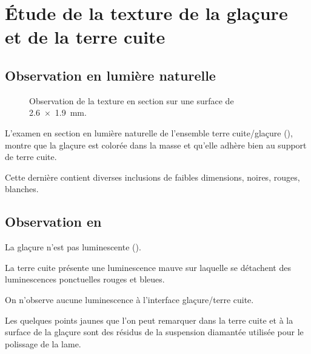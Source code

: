 \section{Étude de la texture de la glaçure et de la terre cuite}

\subsection{Observation en lumière naturelle}
\begin{figure}[htb]
  \begin{minipage}[t]{0.4\textwidth}
  \end{minipage}
  \begin{minipage}[t]{0.4\textwidth}
    \subcaption{\CL \label{texture:6530_CL}}
  \end{minipage}
  \caption[\ -- Observation de la texture en section]
          {\legendeC 
           Observation de la texture en section sur une surface de 
           \SI{2.6x1.9}{\mm}.}
  \label{texture:6530}
\end{figure}

L'examen en section en lumière naturelle de l'ensemble terre 
cuite/glaçure (), montre que la glaçure est 
colorée dans la masse et qu'elle adhère bien au support de terre cuite.

Cette dernière contient diverses inclusions de faibles dimensions,
noires, rouges, blanches.

\subsection{Observation en \CL}
La glaçure n'est pas luminescente ().

La terre cuite présente une luminescence mauve sur laquelle se 
détachent des luminescences ponctuelles rouges et bleues.

On n'observe aucune luminescence à l'interface glaçure/terre cuite.

Les quelques points jaunes que l'on peut remarquer dans la terre cuite 
et à la surface de la glaçure sont des résidus de la suspension 
diamantée utilisée pour le polissage de la lame.

